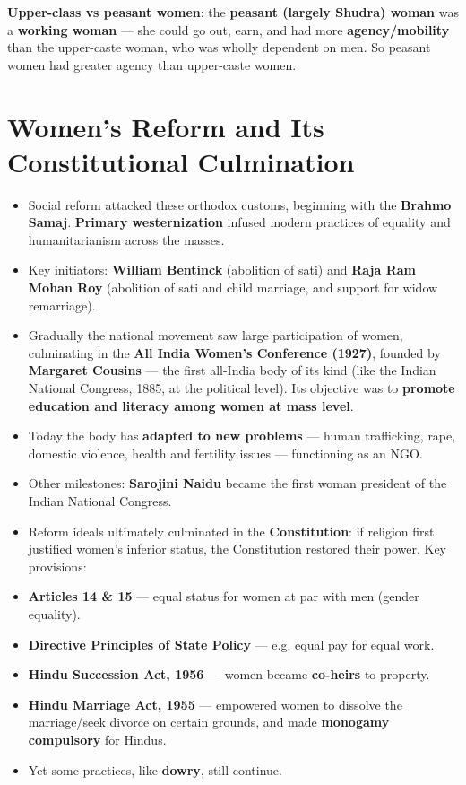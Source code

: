 \begin{ExampleBox}
\textbf{Upper-class vs peasant women}: the \textbf{peasant (largely Shudra) woman} was a \textbf{working woman} --- she could go out, earn, and had more \textbf{agency/mobility} than the upper-caste woman, who was wholly dependent on men. So peasant women had greater agency than upper-caste women.
\end{ExampleBox}

\section{Women's Reform and Its Constitutional Culmination}

\begin{KeyConcept}
\begin{itemize}
\item Social reform attacked these orthodox customs, beginning with the \textbf{Brahmo Samaj}. \textbf{Primary westernization} infused modern practices of equality and humanitarianism across the masses.
\item Key initiators: \textbf{William Bentinck} (abolition of sati) and \textbf{Raja Ram Mohan Roy} (abolition of sati and child marriage, and support for widow remarriage).
\item Gradually the national movement saw large participation of women, culminating in the \textbf{All India Women's Conference (1927)}, founded by \textbf{Margaret Cousins} --- the first all-India body of its kind (like the Indian National Congress, 1885, at the political level). Its objective was to \textbf{promote education and literacy among women at mass level}.
\item Today the body has \textbf{adapted to new problems} --- human trafficking, rape, domestic violence, health and fertility issues --- functioning as an NGO.
\item Other milestones: \textbf{Sarojini Naidu} became the first woman president of the Indian National Congress.
\end{itemize}
\end{KeyConcept}

\begin{GovtPolicy}
\begin{itemize}
\item Reform ideals ultimately culminated in the \textbf{Constitution}: if religion first justified women's inferior status, the Constitution restored their power. Key provisions:
\item \textbf{Articles 14 \& 15} --- equal status for women at par with men (gender equality).
\item \textbf{Directive Principles of State Policy} --- e.g. equal pay for equal work.
\item \textbf{Hindu Succession Act, 1956} --- women became \textbf{co-heirs} to property.
\item \textbf{Hindu Marriage Act, 1955} --- empowered women to dissolve the marriage/seek divorce on certain grounds, and made \textbf{monogamy compulsory} for Hindus.
\item Yet some practices, like \textbf{dowry}, still continue.
\end{itemize}
\end{GovtPolicy}

